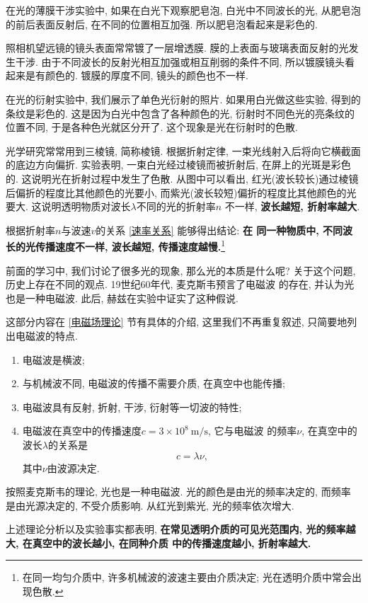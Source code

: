 \documentclass[11pt,a4paper]{ctexbook}
\newcommand{\unit}[1]{\ \mathrm{#1}}
\begin{document}
在光的薄膜干涉实验中, 如果在白光下观察肥皂泡, 白光中不同波长的光, 从肥皂泡的前后表面反射后, 在不同的位置相互加强.
所以肥皂泡看起来是彩色的.

照相机望远镜的镜头表面常常镀了一层增透膜.
膜的上表面与玻璃表面反射的光发生干涉. 由于不同波长的反射光相互加强或相互削弱的条件不同,
所以镀膜镜头看起来是有颜色的. 镀膜的厚度不同, 镜头的颜色也不一样.

在光的衍射实验中, 我们展示了单色光衍射的照片. 如果用白光做这些实验, 得到的条纹是彩色的.
这是因为白光中包含了各种颜色的光, 衍射时不同色光的亮条纹的位置不同, 于是各种色光就区分开了.
这个现象是光在衍射时的色散.

光学研究常常用到三棱镜, 简称棱镜. 根据折射定律, 一束光线射入后将向它横截面的底边方向偏折.
实验表明, 一束白光经过棱镜而被折射后, 在屏上的光斑是彩色的.
这说明光在折射过程中发生了色散. 从图中可以看出, 红光(波长较长)通过棱镜后偏折的程度比其他颜色的光要小,
而紫光(波长较短)偏折的程度比其他颜色的光要大. 这说明透明物质对波长$\lambda$不同的光的折射率$n$
不一样, \textbf{波长越短, 折射率越大}.

根据折射率$n$与波速$v$的关系 \eqref{速率关系} 能够得出结论: \textbf{在
同一种物质中, 不同波长的光传播速度不一样, 波长越短, 传播速度越慢.}\footnote{在同一均匀介质中, 许多机械波的波速主要由介质决定; 光在透明介质中常会出现色散.}

前面的学习中, 我们讨论了很多光的现象, 那么光的本质是什么呢?
关于这个问题, 历史上存在不同的观点. 19世纪60年代, 麦克斯韦预言了电磁波
的存在, 并认为光也是一种电磁波. 此后, 赫兹在实验中证实了这种假说.

这部分内容在 \ref{电磁场理论} 节有具体的介绍, 这里我们不再重复叙述,
只简要地列出电磁波的特点.

\begin{enumerate}
    \item 电磁波是横波;
    \item 与机械波不同, 电磁波的传播不需要介质, 在真空中也能传播;
    \item 电磁波具有反射, 折射, 干涉, 衍射等一切波的特性;
    \item 电磁波在真空中的传播速度$c = 3\times 10^8\unit{m/s}$, 它与电磁波
    的频率$\nu$, 在真空中的波长$\lambda$的关系是$$c = \lambda\nu,$$其中$\nu$由波源决定.
\end{enumerate}

按照麦克斯韦的理论, 光也是一种电磁波. 光的颜色是由光的频率决定的, 而频率
是由光源决定的, 不受介质影响. 从红光到紫光, 光的频率依次增大.

上述理论分析以及实验事实都表明, \textbf{在常见透明介质的可见光范围内, 光的频率越大, 在真空中的波长越小, 在同种介质
中的传播速度越小, 折射率越大.}
\end{document}

